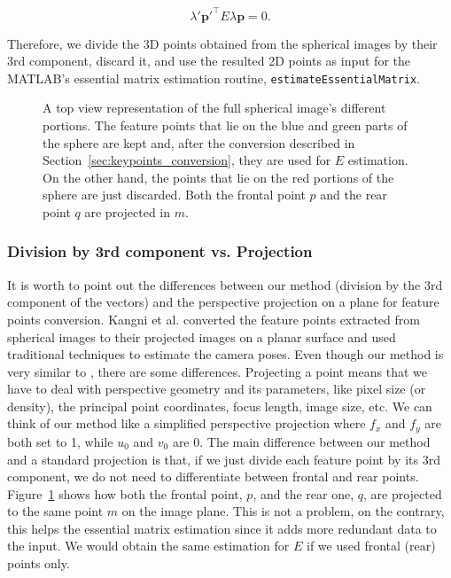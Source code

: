 \begin{equation*}
\lambda'\mathbf{p}'^\top E\lambda\mathbf{p} = 0 \text{.}
\end{equation*}

Therefore, we divide the 3D points obtained from the spherical images by their 
3rd component, discard it, and use the resulted 2D points as input for the 
MATLAB's essential matrix estimation routine, {\tt estimateEssentialMatrix}.

\begin{figure}
    \centering
    \def\svgwidth{0.8\columnwidth}
    
    \caption{A top view representation of the full spherical image's 
    different portions.
    The feature points that lie on the blue and green parts of the sphere are kept and,
    after the conversion described in Section~\ref{sec:keypoints_conversion},
    they are used for $E$ estimation. On the other hand, the points that lie
    on the red portions of the sphere are just discarded.
    Both the frontal point $p$ and the rear point $q$ are projected in $m$.}
	\label{fig:sphere_division}
\end{figure}

\subsubsection{Division by 3rd component vs. Projection}
It is worth to point out the differences between our method (division by the 3rd 
component of the vectors) and the perspective projection on a plane for feature
points conversion. Kangni et al. \cite{kangni2007orientation} converted the 
feature points extracted from spherical images to their projected images on a 
planar surface and used traditional techniques to estimate the camera poses.
Even though our method is very similar to \cite{kangni2007orientation}, there 
are some differences.
Projecting a point means that we have to deal with perspective geometry and its
parameters, like pixel size (or density), the principal point coordinates, 
focus length, image size, etc.
We can think of our method like a simplified perspective projection where
$f_x$ and $f_y$ are both set to 1, while $u_0$ and $v_0$ are 0.
The main difference between our method and a standard projection is that, if we
just divide each feature point by its 3rd component, we do not need to 
differentiate between frontal and rear points.
Figure~\ref{fig:sphere_division} shows how both the frontal point, $p$, and the 
rear one, $q$, are projected to the same point $m$ on the image plane.
This is not a problem, on the contrary, this helps the essential matrix 
estimation since it adds more redundant data to the input. We would obtain the
same estimation for $E$ if we used frontal (rear) points only.

